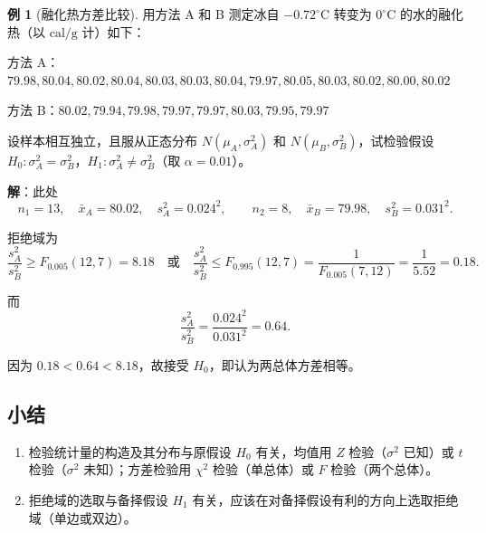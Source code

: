 \documentclass[11pt,a4paper]{report}
\theoremstyle{definition}
\newtheorem{example}{例}[chapter]
\begin{document}
\begin{example}[融化热方差比较]
用方法 A 和 B 测定冰自 $-0.72^{\circ}\mathrm{C}$ 转变为 $0^{\circ}\mathrm{C}$ 的水的融化热（以 $\mathrm{cal/g}$ 计）如下：

方法 A：$79.98, 80.04, 80.02, 80.04, 80.03, 80.03, 80.04, 79.97, 80.05, 80.03, 80.02, 80.00, 80.02$

方法 B：$80.02, 79.94, 79.98, 79.97, 79.97, 80.03, 79.95, 79.97$

设样本相互独立，且服从正态分布 $N(\mu_{A},\sigma_{A}^{2})$ 和 $N(\mu_{B},\sigma_{B}^{2})$，试检验假设 $H_{0}\colon\sigma_{A}^{2}=\sigma_{B}^{2}$，$H_{1}\colon\sigma_{A}^{2}\neq\sigma_{B}^{2}$（取 $\alpha=0.01$）。

\textbf{解}：此处
\[
n_{1}=13,\quad \bar{x}_{A}=80.02,\quad s_{A}^{2}=0.024^{2},\qquad
n_{2}=8,\quad \bar{x}_{B}=79.98,\quad s_{B}^{2}=0.031^{2}.
\]

拒绝域为
\[
\frac{s_{A}^{2}}{s_{B}^{2}}\geq F_{0.005}(12,7)=8.18
\quad\text{或}\quad
\frac{s_{A}^{2}}{s_{B}^{2}}\leq F_{0.995}(12,7)=\frac{1}{F_{0.005}(7,12)}=\frac{1}{5.52}=0.18.
\]

而
\[
\frac{s_{A}^{2}}{s_{B}^{2}}=\frac{0.024^{2}}{0.031^{2}}=0.64.
\]

因为 $0.18<0.64<8.18$，故接受 $H_{0}$，即认为两总体方差相等。
\end{example}

\subsection{小结}

\begin{enumerate}[label=(\arabic*),leftmargin=2em]
    \item 检验统计量的构造及其分布与原假设 $H_{0}$ 有关，均值用 $Z$ 检验（$\sigma^{2}$ 已知）或 $t$ 检验（$\sigma^{2}$ 未知）；方差检验用 $\chi^{2}$ 检验（单总体）或 $F$ 检验（两个总体）。
    \item 拒绝域的选取与备择假设 $H_{1}$ 有关，应该在对备择假设有利的方向上选取拒绝域（单边或双边）。
\end{enumerate}
\end{document}
